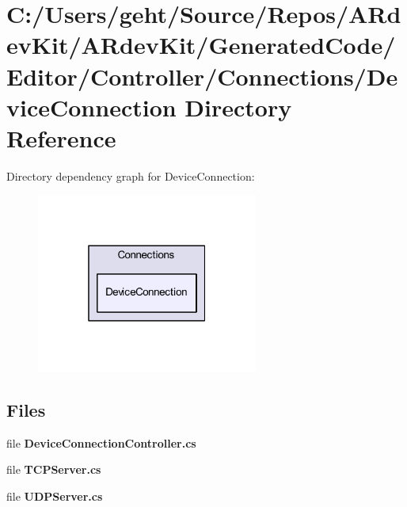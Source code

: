 \section{C\-:/\-Users/geht/\-Source/\-Repos/\-A\-Rdev\-Kit/\-A\-Rdev\-Kit/\-Generated\-Code/\-Editor/\-Controller/\-Connections/\-Device\-Connection Directory Reference}
\label{dir_d28a6703b8b4d3853446f6153acbfef0}
Directory dependency graph for Device\-Connection\-:
\nopagebreak
\begin{figure}[H]
\begin{center}
\leavevmode
\includegraphics[width=206pt]{dir_d28a6703b8b4d3853446f6153acbfef0_dep}
\end{center}
\end{figure}
\subsection*{Files}
\begin{DoxyCompactItemize}
\item 
file {\bfseries Device\-Connection\-Controller.\-cs}
\item 
file {\bfseries T\-C\-P\-Server.\-cs}
\item 
file {\bfseries U\-D\-P\-Server.\-cs}
\end{DoxyCompactItemize}
